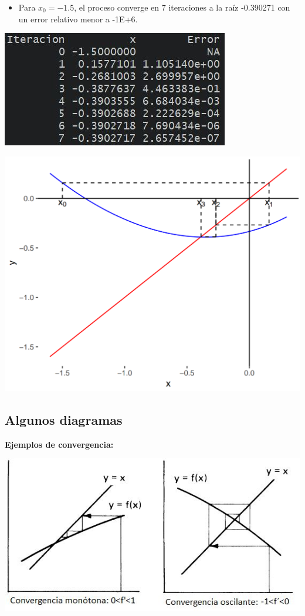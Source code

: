 \documentclass[openany]{book}
\providecommand{\tightlist}{%
  \setlength{\itemsep}{0pt}\setlength{\parskip}{0pt}}
\begin{document}
\begin{itemize}
\tightlist
\item
  Para \(x_0 = -1.5\), el proceso converge en 7 iteraciones a la raíz -0.390271 con un error relativo menor a -1E+6.
\end{itemize}

\begin{center}\includegraphics[width=0.6\linewidth]{Plots/U2/rtdo} \end{center}

\begin{center}\includegraphics[width=1\linewidth]{Plots/U2/f3} \end{center}

\hypertarget{algunos-diagramas}{%
\subsection{Algunos diagramas}\label{algunos-diagramas}}

\textbf{Ejemplos de convergencia:}

\begin{center}\includegraphics[width=0.75\linewidth]{Plots/U2/convergencia} \end{center}
\end{document}
